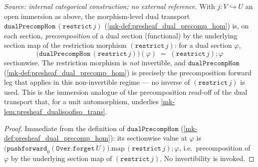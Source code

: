 \begin{lemma}\label{mk-lem:dual_precomp_hom_restrict_apply}
  \leanok

  \textit{Source: internal categorical construction; no external reference.}
  With \(j : V \hookrightarrow U\) an open immersion as above, the morphism-level dual transport
  \(\mathtt{dualPrecompHom}\,(\mathtt{restrict}\,j)\) (\ref{mk-def:presheaf_dual_precomp_hom}) is, on
  each section, \emph{precomposition} of a dual section (functional) by the underlying section map of
  the restriction morphism \((\mathtt{restrict}\,j)\): for a dual section \(\varphi\),
  \[
    \bigl(\mathtt{dualPrecompHom}\,(\mathtt{restrict}\,j)\bigr)(\varphi)
      \;=\; (\mathtt{restrict}\,j) \mathbin{;} \varphi
  \]
  sectionwise. The restriction morphism is \emph{not} invertible, and
  \(\mathtt{dualPrecompHom}\) (\ref{mk-def:presheaf_dual_precomp_hom}) is precisely the precomposition
  forward leg that applies in this non-invertible regime --- no inverse of \((\mathtt{restrict}\,j)\)
  is used. This is the immersion analogue of the precomposition read-off of the dual transport that,
  for a unit automorphism, underlies \ref{mk-lem:presheaf_dualisoofiso_trans}.
\end{lemma}
\begin{proof}
  \leanok
  Immediate from the definition of \(\mathtt{dualPrecompHom}\)
  (\ref{mk-def:presheaf_dual_precomp_hom}): its sectionwise value at \(\varphi\) is
  \(\bigl(\mathtt{pushforward}_0(\mathtt{Over.forget}\,U)\bigr).\mathrm{map}\,(\mathtt{restrict}\,j)
  \mathbin{;} \varphi\), i.e.\ precomposition of \(\varphi\) by the underlying section map of
  \((\mathtt{restrict}\,j)\). No invertibility is invoked.
\end{proof}

